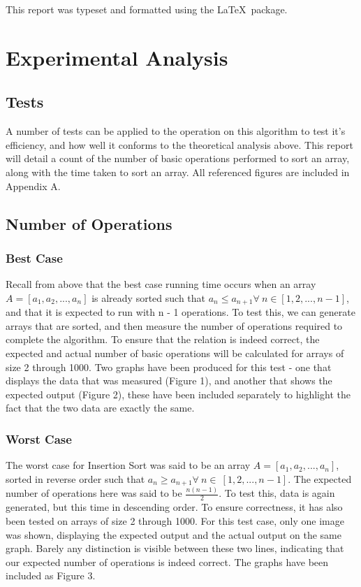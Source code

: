 \documentclass{article}
\begin{document}
    This report was typeset and formatted using the \LaTeX\  package.

\section{Experimental Analysis}

    \subsection{Tests}
        A number of tests can be applied to the operation on this algorithm to test it's efficiency, and how well it conforms to the theoretical analysis above. This report will detail a count of the number of basic operations performed to sort an array, along with the time taken to sort an array. All referenced figures are included in Appendix A.
    \subsection{Number of Operations}

        \subsubsection{Best Case}
            Recall from above that the best case running time occurs when an array $A = [a_1, a_2, ..., a_n]$ is already sorted such that $a_n \leq a_{n+1} \forall\ n \in [1, 2, ..., n - 1]$, and that it is expected to run with n - 1 operations. To test this, we can generate arrays that are sorted, and then measure the number of operations required to complete the algorithm. To ensure that the relation is indeed correct, the expected and actual number of basic operations will be calculated for arrays of size 2 through 1000. Two graphs have been produced for this test - one that displays the data that was measured (Figure 1), and another that shows the expected output (Figure 2), these have been included separately to highlight the fact that the two data are exactly the same.

        \subsubsection{Worst Case}
            The worst case for Insertion Sort was said to be an array $A = [a_1, a_2, ..., a_n]$, sorted in reverse order such that $a_n \geq a_{n+1} \forall\ n \in\ [1, 2, ..., n - 1]$. The expected number of operations here was said to be $\frac{n(n - 1)}{2}$. To test this, data is again generated, but this time in descending order. To ensure correctness, it has also been tested on arrays of size 2 through 1000. For this test case, only one image was shown, displaying the expected output and the actual output on the same graph. Barely any distinction is visible between these two lines, indicating that our expected number of operations is indeed correct. The graphs have been included as Figure 3.
\end{document}
